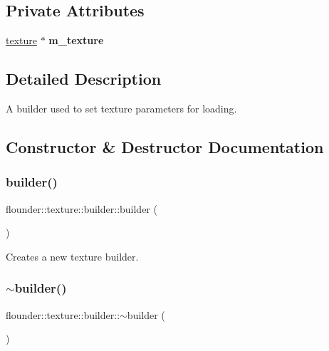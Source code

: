 \subsection*{Private Attributes}
\begin{DoxyCompactItemize}
\item 
\mbox{\label{classflounder_1_1texture_1_1builder_a0486909deb0c3bfddd717edf2e1d00dc}} 
\hyperlink{classflounder_1_1texture}{texture} $\ast$ {\bfseries m\+\_\+texture}
\end{DoxyCompactItemize}


\subsection{Detailed Description}
A builder used to set texture parameters for loading. 



\subsection{Constructor \& Destructor Documentation}
\mbox{\label{classflounder_1_1texture_1_1builder_a27fbdb4c16d74fd63c680b992911f41a}} 
\subsubsection{\texorpdfstring{builder()}{builder()}}
{\footnotesize\ttfamily flounder\+::texture\+::builder\+::builder (\begin{DoxyParamCaption}{ }\end{DoxyParamCaption})}



Creates a new texture builder. 

\mbox{\label{classflounder_1_1texture_1_1builder_a4942b7196e535632cfe38906c3fe7602}} 
\subsubsection{\texorpdfstring{$\sim$builder()}{~builder()}}
{\footnotesize\ttfamily flounder\+::texture\+::builder\+::$\sim$builder (\begin{DoxyParamCaption}{ }\end{DoxyParamCaption})}



